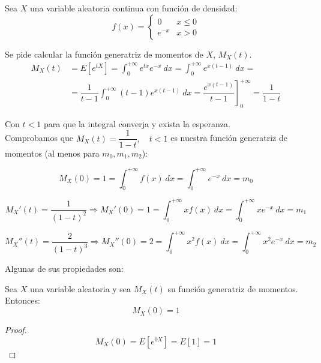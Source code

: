 \begin{ejemplo}
    Sea $X$ una variable aleatoria continua con función de densidad:
    $$f(x) = \left\{ \begin{array}{ll}
        0      & x \leq 0 \\
        e^{-x} & x > 0
      \end{array} \right.$$
    
    Se pide calcular la función generatriz de momentos de $X$, $M_X(t)$.
    \begin{equation*}\begin{split}
        M_X(t) &= E[e^{tX}] = \int_0^{+\infty} e^{tx} e^{-x}~dx = \int_0^{+\infty} e^{x(t-1)}~dx =\\
        &=\dfrac{1}{t-1} \int_0^{+\infty} (t-1) e^{x(t-1)}~dx = \left. \dfrac{e^{x(t-1)}}{t-1} \right]_0^{+\infty} = \dfrac{1}{1-t}
    \end{split}\end{equation*}
    
    Con $t<1$ para que la integral converja y exista la esperanza.\\
    
    Comprobamos que $M_X(t) = \dfrac{1}{1-t},\quad t<1$ es nuestra función generatriz de momentos (al menos para $m_0,m_1,m_2$):
    
    $$M_X(0) = 1 = \int_0^{+\infty} f(x)~dx = \int_0^{+\infty} e^{-x}~dx = m_0$$
    
    $$M_X'(t) = \dfrac{1}{(1-t)^2}\Longrightarrow M_X'(0) = 1 = \int_0^{+\infty} xf(x)~dx = \int_0^{+\infty} xe^{-x}~dx = m_1$$
    
    $$M_X''(t) = \dfrac{2}{(1-t)^3} \Longrightarrow M_X''(0) = 2 = \int_0^{+\infty} x^2f(x)~dx = \int_0^{+\infty} x^2e^{-x}~dx = m_2$$
\end{ejemplo}

Algunas de sus propiedades son:
\begin{lema}
    Sea $X$ una variable aleatoria y sea $M_X(t)$ su función generatriz de momentos. Entonces:
    $$M_X(0)=1$$
\end{lema}
\begin{proof}
    $$M_X(0) = E[e^{0X}] = E[1] = 1$$
\end{proof}


